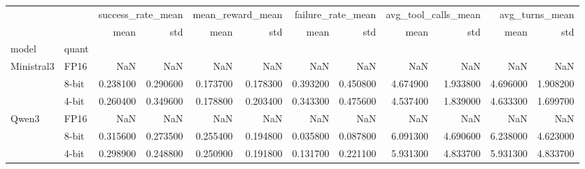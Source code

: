 \begin{tabular}{llrrrrrrrrrr}
\toprule
 &  & \multicolumn{2}{r}{success_rate_mean} & \multicolumn{2}{r}{mean_reward_mean} & \multicolumn{2}{r}{failure_rate_mean} & \multicolumn{2}{r}{avg_tool_calls_mean} & \multicolumn{2}{r}{avg_turns_mean} \\
 &  & mean & std & mean & std & mean & std & mean & std & mean & std \\
model & quant &  &  &  &  &  &  &  &  &  &  \\
\midrule
\multirow[t]{3}{*}{Ministral3} & FP16 & NaN & NaN & NaN & NaN & NaN & NaN & NaN & NaN & NaN & NaN \\
 & 8-bit & 0.238100 & 0.290600 & 0.173700 & 0.178300 & 0.393200 & 0.450800 & 4.674900 & 1.933800 & 4.696000 & 1.908200 \\
 & 4-bit & 0.260400 & 0.349600 & 0.178800 & 0.203400 & 0.343300 & 0.475600 & 4.537400 & 1.839000 & 4.633300 & 1.699700 \\
\cline{1-12}
\multirow[t]{3}{*}{Qwen3} & FP16 & NaN & NaN & NaN & NaN & NaN & NaN & NaN & NaN & NaN & NaN \\
 & 8-bit & 0.315600 & 0.273500 & 0.255400 & 0.194800 & 0.035800 & 0.087800 & 6.091300 & 4.690600 & 6.238000 & 4.623000 \\
 & 4-bit & 0.298900 & 0.248800 & 0.250900 & 0.191800 & 0.131700 & 0.221100 & 5.931300 & 4.833700 & 5.931300 & 4.833700 \\
\cline{1-12}
\bottomrule
\end{tabular}
